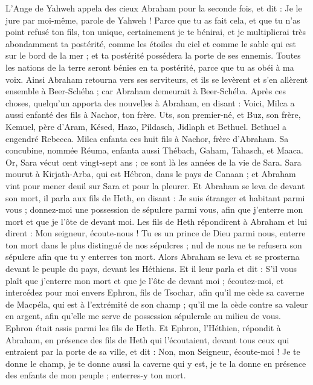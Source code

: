 \begin{multicols}{2}
L'Ange de Yahweh appela des cieux Abraham pour la seconde fois,
et dit : Je le jure par moi-même, parole de Yahweh ! Parce que tu as fait cela, et que tu n'as point refusé ton fils, ton unique,
certainement je te bénirai, et je multiplierai très abondamment ta postérité, comme les étoiles du ciel et comme le sable qui est sur le bord de la mer ; et ta postérité possédera la porte de ses ennemis.
Toutes les nations de la terre seront bénies en ta postérité, parce que tu as obéi à ma voix.
Ainsi Abraham retourna vers ses serviteurs, et ils se levèrent et s'en allèrent ensemble à Beer-Schéba ; car Abraham demeurait à Beer-Schéba.
Après ces choses, quelqu'un apporta des nouvelles à Abraham, en disant : Voici, Milca a aussi enfanté des fils à Nachor, ton frère.
Uts, son premier-né, et Buz, son frère, Kemuel, père d'Aram,
Késed, Hazo, Pildasch, Jidlaph et Bethuel.
Bethuel a engendré Rebecca. Milca enfanta ces huit fils à Nachor, frère d'Abraham.
Sa concubine, nommée Réuma, enfanta aussi Thébach, Gaham, Tahasch, et Maaca.
\VerseOne{}Or, Sara vécut cent vingt-sept ans ; ce sont là les années de la vie de Sara.
Sara mourut à Kirjath-Arba, qui est Hébron, dans le pays de Canaan ; et Abraham vint pour mener deuil sur Sara et pour la pleurer.
Et Abraham se leva de devant son mort, il parla aux fils de Heth, en disant :
Je suis étranger et habitant parmi vous ; donnez-moi une possession de sépulcre parmi vous, afin que j'enterre mon mort et que je l'ôte de devant moi.
Les fils de Heth répondirent à Abraham et lui dirent :
Mon seigneur, écoute-nous ! Tu es un prince de Dieu parmi nous, enterre ton mort dans le plus distingué de nos sépulcres ; nul de nous ne te refusera son sépulcre afin que tu y enterres ton mort.
Alors Abraham se leva et se prosterna devant le peuple du pays, devant les Héthiens.
Et il leur parla et dit : S'il vous plaît que j'enterre mon mort et que je l'ôte de devant moi ; écoutez-moi, et intercédez pour moi envers Ephron, fils de Tsochar,
afin qu'il me cède sa caverne de Macpéla, qui est à l’extrémité de son champ ; qu'il me la cède contre sa valeur en argent, afin qu’elle me serve de possession sépulcrale au milieu de vous.
Ephron était assis parmi les fils de Heth. Et Ephron, l’Héthien, répondit à Abraham, en présence des fils de Heth qui l'écoutaient, devant tous ceux qui entraient par la porte de sa ville, et dit :
Non, mon Seigneur, écoute-moi ! Je te donne le champ, je te donne aussi la caverne qui y est, je te la donne en présence des enfants de mon peuple ; enterres-y ton mort.

\end{multicols}
